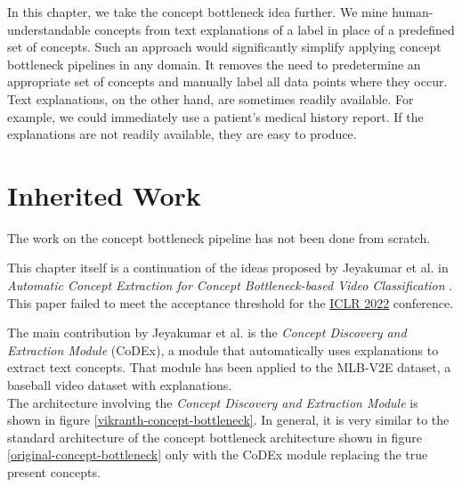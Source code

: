 In this chapter, we take the concept bottleneck idea further.
We mine human-understandable concepts from text explanations of a label in place of a predefined set of concepts.
Such an approach would significantly simplify applying concept bottleneck pipelines in any domain.
It removes the need to predetermine an appropriate set of concepts and manually label all data points where they occur.
Text explanations, on the other hand, are sometimes readily available. For example, we could immediately use a patient's medical history report.
If the explanations are not readily available, they are easy to produce.


\section{Inherited Work}
\label{inherited-work}

The work on the concept bottleneck pipeline has not been done from scratch.

This chapter itself is a continuation of the ideas proposed by Jeyakumar et al. in \emph{Automatic Concept Extraction for Concept Bottleneck-based Video Classification} \cite{RefWorks:RefID:16-2021automatic}. This paper failed to meet the acceptance threshold for the \href{https://iclr.cc/}{ICLR 2022} conference. 

The main contribution by Jeyakumar et al. is the \emph{Concept Discovery and Extraction Module} (CoDEx), a module that automatically uses explanations to extract text concepts.
That module has been applied to the MLB-V2E dataset, a baseball video dataset with explanations. \\
The architecture involving the \emph{Concept Discovery and Extraction Module} is shown in figure \ref{vikranth-concept-bottleneck}. 
In general, it is very similar to the standard architecture of the concept bottleneck architecture shown in figure \ref{original-concept-bottleneck} only with the CoDEx module replacing the true present concepts.

